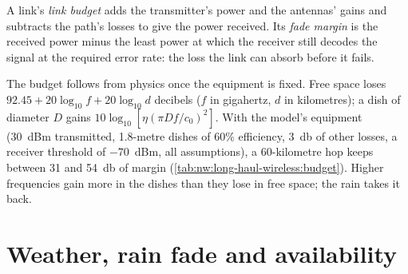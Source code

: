 \begin{omfigure}

\label{fig:nw:long-haul-wireless:hop}
\end{omfigure}

\begin{definition}\label{def:nw:long-haul-wireless:budget}
A link's \emph{link budget} adds the transmitter's power and the antennas' gains and subtracts the path's losses to give the
power received. Its \emph{fade margin} is the received power minus the least power at which the receiver still decodes the
signal at the required error rate: the loss the link can absorb before it fails.
\end{definition}

The budget follows from physics once the equipment is fixed. Free space loses $92.45 + 20\log_{10} f + 20\log_{10} d$ decibels ($f$ in
gigahertz, $d$ in kilometres); a dish of diameter $D$ gains $10\log_{10}[\eta(\pi D f/c_0)^2]$. With the model's equipment (30~dBm
transmitted, 1.8-metre dishes of 60\% efficiency, \qty{3}{\decibel} of other losses, a receiver threshold of $-70$~dBm, all assumptions),
a 60-kilometre hop keeps between 31 and \qty{54}{\decibel} of margin (\cref{tab:nw:long-haul-wireless:budget}). Higher frequencies gain more in
the dishes than they lose in free space; the rain takes it back.

\section{Weather, rain fade and availability}

